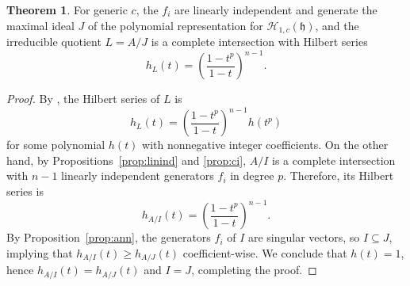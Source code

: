 \documentclass{amsart}
\numberwithin{equation}{section}
\theoremstyle{definition}
\newtheorem{theorem}{Theorem}[section]
\newcommand{\h}{\mathfrak{h}}
\newcommand{\HH}{\mathcal{H}}
\begin{document}
\begin{theorem}\label{thm:main}
For generic $c$, the $f_i$ are linearly independent and generate the maximal ideal $J$ of the polynomial representation for $\HH_{1, c}(\h)$, and the irreducible quotient $L = A/J$ is a complete intersection with Hilbert series 
\[
h_L(t) = \left(\frac{1-t^p}{1-t}\right)^{n-1}.
\]
\end{theorem}
\begin{proof}
By \cite[Proposition 3.4]{BC1}, the Hilbert series of $L$ is 
\[
h_L(t) = \left(\frac{1-t^p}{1-t}\right)^{n-1}h(t^p)
\]
for some polynomial $h(t)$ with nonnegative integer coefficients.  On the other hand, by Propositions~\ref{prop:linind} and \ref{prop:ci}, $A/I$ is a complete intersection with $n-1$ linearly independent generators $f_i$ in degree $p$.  Therefore, its Hilbert series is 
\[
h_{A/I}(t)=\left(\frac{1-t^p}{1-t}\right)^{n-1}.
\]
By Proposition~\ref{prop:ann}, the generators $f_i$ of $I$ are singular vectors, so $I \subseteq J$, implying that $h_{A/I}(t) \ge h_{A/J}(t)$ coefficient-wise.  We conclude that $h(t) = 1$, hence $h_{A/I}(t)=h_{A/J}(t)$ and $I=J$, completing the proof.
\end{proof}



\end{document}
